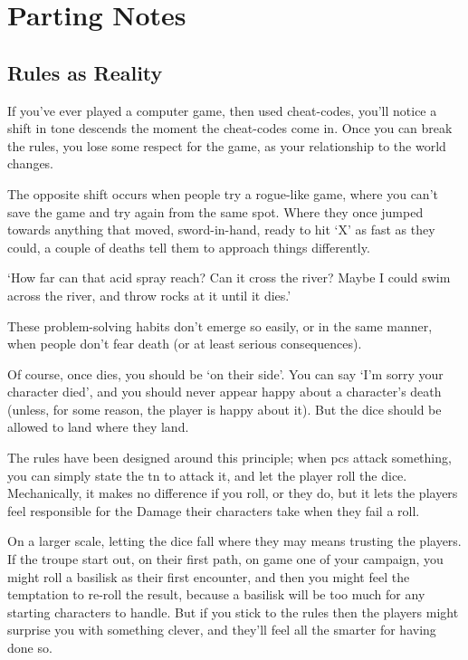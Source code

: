 \section{Parting Notes}

\begin{multicols}{2}

\subsection{Rules as Reality}

If you've ever played a computer game, then used cheat-codes, you'll notice a shift in tone descends the moment the cheat-codes come in.
Once you can break the rules, you lose some respect for the game, as your relationship to the world changes.

The opposite shift occurs when people try a rogue-like game, where you can't save the game and try again from the same spot.
Where they once jumped towards anything that moved, sword-in-hand, ready to hit `X' as fast as they could, a couple of deaths tell them to approach things differently.

\begin{speechtext}
  `How far can that acid spray reach?
  Can it cross the river?
  Maybe I could swim across the river, and throw rocks at it until it dies.'
\end{speechtext}

These problem-solving habits don't emerge so easily, or in the same manner, when people don't fear death (or at least serious consequences).

Of course, once  dies, you should be `on their side'.
You can say `I'm sorry your character died', and you should never appear happy about a character's death (unless, for some reason, the player is happy about it).
But the dice should be allowed to land where they land.

The rules have been designed around this principle; when \glspl{pc} attack something, you can simply state the \gls{tn} to attack it, and let the player roll the dice.
Mechanically, it makes no difference if you roll, or they do, but it lets the players feel responsible for the Damage their characters take when they fail a roll.

On a larger scale, letting the dice fall where they may means trusting the players.
If the troupe start out, on their first path, on game one of your \gls{campaign}, you might roll a basilisk as their first encounter, and then you might feel the temptation to re-roll the result, because a basilisk will be too much for any starting characters to handle.
But if you stick to the rules then the players might surprise you with something clever, and they'll feel all the smarter for having done so.


\end{multicols}
